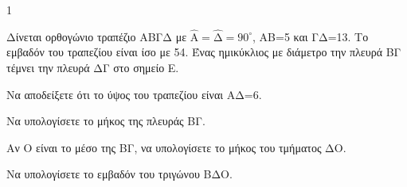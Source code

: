 \begin{ylh}{1}
    \item[Γεωμετρία Β' Λυκείου, Μετρικές σχέσεις, Εμβαδά]
\end{ylh}
\begin{figure}
\centering
{}
\end{figure}
Δίνεται ορθογώνιο τραπέζιο ΑΒΓΔ με $\hat{\text{Α}}=\hat{\text{Δ}}=90^\circ$, ΑΒ=5 και ΓΔ=13. Το εμβαδόν του τραπεζίου είναι ίσο με 54. Ένας ημικύκλιος με διάμετρο την πλευρά ΒΓ τέμνει την πλευρά ΔΓ στο σημείο Ε.
\begin{alist}
\item Να αποδείξετε ότι το ύψος του τραπεζίου είναι ΑΔ=6. 
\item Να υπολογίσετε το μήκος της πλευράς ΒΓ. 
\item Αν Ο είναι το μέσο της ΒΓ, να υπολογίσετε το μήκος του τμήματος ΔΟ. 
\item Να υπολογίσετε το εμβαδόν του τριγώνου ΒΔΟ. 
\end{alist}